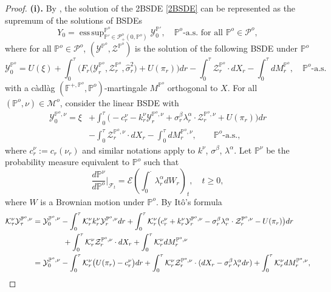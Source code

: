 \documentclass[11pt,a4paper]{article}
\numberwithin{equation}{section}
\def\dbF{\mathbb{F}}
\def\dbP{\mathbb{P}}
\newcommand{\cE}{\mathcal{E}}
\newcommand{\cF}{\mathcal{F}}
\newcommand{\cK}{\mathcal{K}}
\newcommand{\cM}{\mathcal{M}}
\newcommand{\cP}{\mathcal{P}}
\newcommand{\cY}{\mathcal{Y}}
\newcommand{\cZ}{\mathcal{Z}}
\DeclareMathOperator*{\esssup}{ess\,sup}
\theoremstyle{definition}
\begin{document}
\begin{proof}
 \textbf{(i).} By \cite[Proposition 5.2]{LRTY18}, the solution of the 2BSDE \eqref{2BSDE} can be represented as the supremum of the solutions of BSDEs 
     \begin{equation} \label{eq:2BSDErep}
        Y_0 = \esssup_{\dbP'\in\cP^o_+(0,\dbP^o)}^{\dbP^o}\cY_0^{\dbP'}, \quad \dbP^o\mbox{-a.s.~for all }\dbP^o\in\cP^o, 
     \end{equation}
     where for all $\dbP^o\in\cP^o$, $(\cY^{\dbP^o},\cZ^{\dbP^o})$ is the solution of the following BSDE under $\dbP^o$
      $$ \cY_0^{\dbP^o} = U(\xi) + \int_0^\tau\Big( F_r\big(\cY^{\dbP^o}_r,\cZ^{\dbP^o}_r,\widehat\sigma_r^2\big) + U(\pi_r)\Big) dr - \int_0^\tau\cZ^{\dbP^o}_r\cdot dX_r -\int_0^\tau dM^{\dbP^o}_r, \quad \dbP^o\mbox{-a.s.} $$
     with a c\`adl\`ag $(\dbF^{+,\dbP^o},\dbP^o)$-martingale $M^{\dbP^o}$ orthogonal to $X$. 
    For all $(\dbP^o,\nu)\in\cM^o$, consider the linear BSDE with 
     \begin{equation}  \label{eq:controlBSDE}
       \begin{aligned}
         \cY^{\dbP^o,\nu}_0 = \xi &+ \int_0^\tau\big(-c^\nu_r - k_r^\nu\cY_r^{\dbP^o,\nu} + \sigma^\beta_r\lambda^\alpha_r\cdot\cZ_r^{\dbP^o,\nu} + U(\pi_r)\big)dr \\ 
                                  &- \int_0^\tau\cZ_r^{\dbP^o,\nu}\cdot dX_r - \int_0^\tau dM^{\dbP^o,\nu}_r, \qquad \dbP^o\mbox{-a.s.},
       \end{aligned}
     \end{equation}
     where $c^\nu_r:=c_r(\nu_r)$ and similar notations apply to $k^\nu$, $\sigma^\beta$, $\lambda^\alpha$. 
    Let $\dbP^\nu$ be the probability measure equivalent to $\dbP^o$ such that 
      $$ \frac{d\dbP^\nu}{d\dbP^o}\bigg|_{\cF_t} = \cE\left(\int_0^\cdot\lambda_r^\alpha dW_r\right)_t, \quad t\geq 0, $$
      where $W$ is a Brownian motion under $\dbP^o$. 
    By It\^o's formula 
     \begin{align*}
      \cK^\nu_\tau\cY^{\dbP^o,\nu}_\tau &= \cY_0^{\dbP^o,\nu} - \int_0^\tau\cK_r^{\nu}k_r^\nu\cY_r^{\dbP^o,\nu} dr + \int_0^\tau\cK_r^\nu\big(c^\nu_r+k^\nu_r\cY_r^{\dbP^o,\nu}-\sigma_r^\beta\lambda^\alpha_r\cdot\cZ_r^{\dbP^o,\nu}-U(\pi_r)\big)dr \\
          & \hspace{14mm} + \int_0^\tau\cK_r^\nu\cZ_r^{\dbP^o,\nu}\cdot dX_r + \int_0^\tau\cK^\nu_rdM^{\dbP^o,\nu}_r  \\
          &= \cY_0^{\dbP^o,\nu} - \int_0^\tau\cK_r^\nu\big(U(\pi_r)-c^\nu_r\big)dr + \int_0^\tau\cK_r^\nu\cZ_r^{\dbP^o,\nu}\cdot (dX_r-\sigma_r^\beta\lambda^\alpha_rdr) + \int_0^\tau\cK^\nu_rdM^{\dbP^o,\nu}_r,

\end{align*}
\end{proof}
\end{document}
